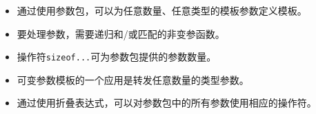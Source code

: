 
\begin{itemize}
\item 
通过使用参数包，可以为任意数量、任意类型的模板参数定义模板。

\item 
要处理参数，需要递归和/或匹配的非变参函数。

\item 
操作符\texttt{sizeof...}可为参数包提供的参数数量。

\item 
可变参数模板的一个应用是转发任意数量的类型参数。

\item 
通过使用折叠表达式，可以对参数包中的所有参数使用相应的操作符。
\end{itemize}